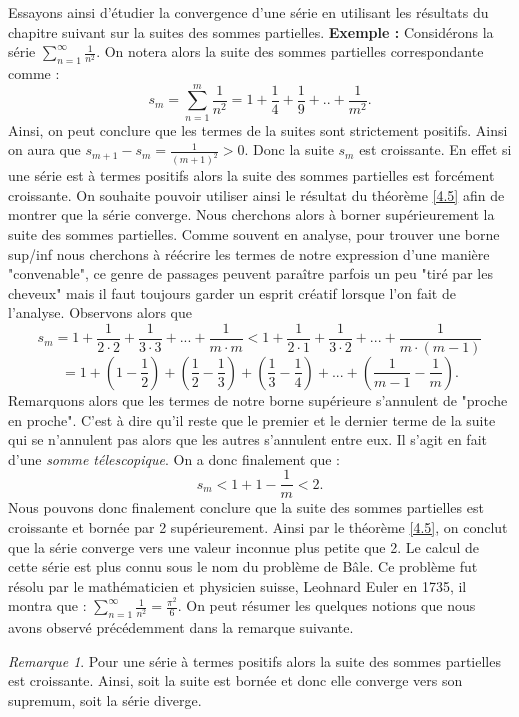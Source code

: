\documentclass[oneside,12pt,french,table]{book}
\theoremstyle{definition}
\theoremstyle{plain}
\theoremstyle{remark}
\newtheorem{remark}[definition]{Remarque}
\begin{document}
Essayons ainsi d'étudier la convergence d'une série en utilisant les résultats du chapitre suivant sur la suites des sommes partielles. \newline
\textbf{Exemple :} Considérons la série $\sum_{n=1}^{\infty} \frac{1}{n^2}$. On notera alors la suite des sommes partielles correspondante comme : $$ s_m = \sum_{n=1}^{m} \frac{1}{n^2} = 1 +  \frac{1}{4} + \frac{1}{9} + .. + \frac{1}{m^2}.$$
Ainsi, on peut conclure que les termes de la suites sont strictement positifs. Ainsi on aura que $s_{m+1} - s_m = \frac{1}{(m+1)^2} > 0$. Donc la suite $s_m$ est croissante. En effet si une série est à termes positifs alors la suite des sommes partielles est forcément croissante. On souhaite pouvoir utiliser ainsi le résultat du théorème \ref{4.5} afin de montrer que la série converge. Nous cherchons alors à borner supérieurement la suite des sommes partielles. Comme souvent en analyse, pour trouver une borne sup/inf nous cherchons à réécrire les termes de notre expression d'une manière "convenable", ce genre de passages peuvent paraître parfois un peu "tiré par les cheveux" mais il faut toujours garder un esprit créatif lorsque l'on fait de l'analyse. Observons alors que $$ s_m = 1 + \frac{1}{2\cdot2} + \frac{1}{3\cdot3} + ... + \frac{1}{m \cdot m} < 1 + \frac{1}{2\cdot1 } + \frac{1}{3\cdot2} + ... + \frac{1}{m \cdot (m-1)}$$
$$= 1 + \left ( 1 - \frac{1}{2} \right ) + \left ( \frac{1}{2} - \frac{1}{3} \right ) + \left ( \frac{1}{3} - \frac{1}{4} \right ) + ... + \left ( \frac{1}{m-1} - \frac{1}{m} \right ) .$$
Remarquons alors que les termes de notre borne supérieure s'annulent de "proche en proche". C'est à dire qu'il reste que le premier et le dernier terme de la suite qui se n'annulent pas alors que les autres s'annulent entre eux. Il s'agit en fait d'une \textit{somme télescopique}. On a donc finalement que : 
$$ s_m < 1+1-\frac{1}{m} < 2. $$ Nous pouvons donc finalement conclure que la suite des sommes partielles est croissante et bornée par 2 supérieurement. Ainsi par le théorème \ref{4.5}, on conclut que la série converge vers une valeur inconnue plus petite que 2. Le calcul de cette série est plus connu sous le nom du problème de Bâle. Ce problème fut résolu par le mathématicien et physicien suisse, Leohnard Euler en 1735, il montra que : $\sum_{n=1}^{\infty} \frac{1}{n^2} = \frac{\pi^2}{6}$. 
\newline 
On peut résumer les quelques notions que nous avons observé précédemment dans la remarque suivante.
\begin{remark}
 Pour une série à termes positifs alors la suite des sommes partielles est croissante. Ainsi, soit la suite est bornée et donc elle converge vers son supremum, soit la série diverge.    
\end{remark}
 
\end{document}
